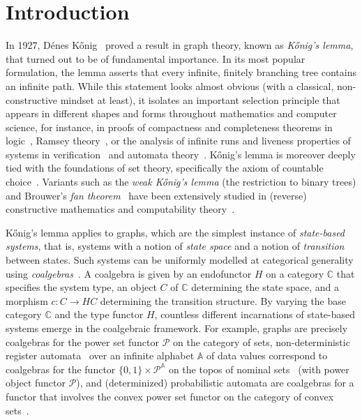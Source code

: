 \documentclass[10pt,a4paper]{article}
\theoremstyle{definition}
\theoremstyle{remark}
\numberwithin{equation}{section}
\newcommand{\Konig}{Kőnig}
\newcommand{\Pow}{\mathcal{P}}
\providecommand{\C}{}
\renewcommand{\C}{{\mathbb{C}}}
\theoremstyle{plain}
\theoremstyle{definition}
\begin{document}
\section{Introduction}
In 1927, Dénes \Konig~\cite{konig1927} proved a result in graph theory, known as \emph{\Konig's lemma}, that turned out to be of fundamental importance. In its most popular formulation, the lemma asserts that every infinite, finitely branching tree contains an infinite path. While this statement looks almost obvious (with a classical, non-constructive mindset at least), it isolates an important selection principle that appears in different shapes and forms throughout mathematics and computer science, for instance, in proofs of compactness and completeness theorems in logic~\cite{teller89}, Ramsey theory~\cite{szekely23}, or the analysis of infinite runs and liveness properties of systems in verification~\cite{brv04} and automata theory~\cite{gmms14,isb16}. \Konig's lemma is moreover deeply tied with the foundations of set theory, specifically the axiom of countable choice~\cite{hr98,jech02}. Variants such as the \emph{weak \Konig's lemma} (the restriction to binary trees) and Brouwer's \emph{fan theorem}~\cite{brouwer27} have been extensively studied in (reverse) constructive mathematics and computability theory~\cite{di21,hirschfeldt14}.

\Konig's lemma applies to graphs, which are the simplest instance of \emph{state-based systems}, that is, systems with a notion of \emph{state space} and a notion of \emph{transition} between states. Such systems can be uniformly modelled at categorical generality using \emph{coalgebras}~\cite{jacobs16,rutten00}. A {coalgebra} is given by an endofunctor $H$ on a category $\C$ that specifies the {system type}, an object $C$ of $\C$ determining the state space, and a morphism $c\colon C\to HC$ determining the transition structure. By varying the base category $\C$ and the type functor $H$, countless different incarnations of state-based systems emerge in the coalgebraic framework. For example, graphs are precisely coalgebras for the power set functor $\Pow$ on the category of sets, non-deterministic register automata~\cite{KaminskiFrancez94} over an infinite alphabet $\mathds{A}$ of data values correspond to coalgebras for the functor $\{0,1\}\times \Pow^{\mathds{A}}$ on the topos of nominal sets~\cite{BojanczykEA14} (with power object functor $\Pow$), and (determinized) probabilistic automata are coalgebras for a functor that involves the convex power set functor on the category of convex sets~\cite{bss17}.
\end{document}
